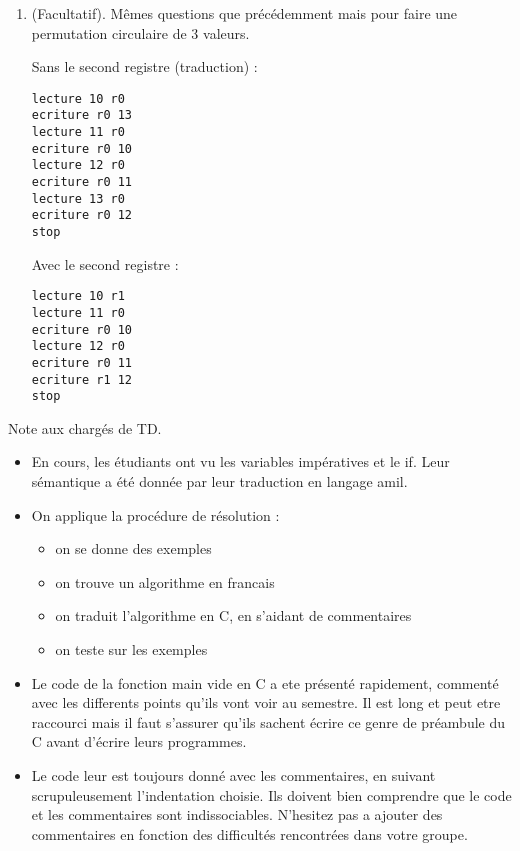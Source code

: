 \begin{enumerate}
\item (Facultatif). Mêmes questions que précédemment mais pour faire une permutation
  circulaire de 3 valeurs.

  \begin{correction}


{\small
{}
}

Sans le second registre (traduction) :
\begin{verbatim}
lecture 10 r0
ecriture r0 13
lecture 11 r0
ecriture r0 10
lecture 12 r0
ecriture r0 11
lecture 13 r0
ecriture r0 12
stop
\end{verbatim}
Avec le second registre :
\begin{verbatim}
lecture 10 r1
lecture 11 r0
ecriture r0 10
lecture 12 r0
ecriture r0 11
ecriture r1 12
stop
\end{verbatim}
\end{correction}
\end{enumerate}


\begin{correction}
  Note aux chargés de TD.
  \begin{itemize}
  \item En cours, les étudiants ont vu les variables impératives et
    le if. Leur sémantique a été donnée par leur traduction en langage
    amil.
  \item On applique la procédure de résolution :
    \begin{itemize}
    \item on se donne des exemples
    \item on trouve un algorithme en francais
    \item on traduit l'algorithme en C, en s'aidant de commentaires
    \item on teste sur les exemples
    \end{itemize}
  \item Le code de la fonction main vide en C a ete présenté rapidement, commenté avec les differents points qu'ils vont voir au semestre. Il est long et peut etre raccourci mais il faut s'assurer qu'ils sachent écrire ce genre de préambule du C avant d'écrire leurs programmes.
  \item Le code leur est toujours donné avec les commentaires, en suivant scrupuleusement l'indentation choisie. Ils doivent bien comprendre que le code et les commentaires sont indissociables. N'hesitez pas a ajouter des commentaires en fonction des difficultés rencontrées dans votre groupe.
  \end{itemize}
\end{correction}

